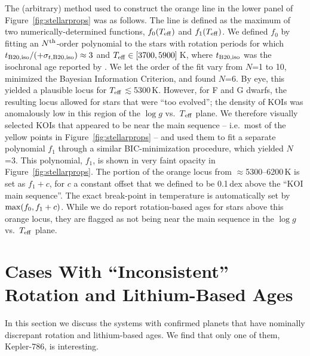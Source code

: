 \documentclass[11pt,twocolumn,tighten]{aastex63}
\begin{document}
The (arbitrary) method used to construct the orange line in 
the lower panel of Figure~\ref{fig:stellarprops} was as follows.
The line is	defined as
the maximum of two numerically-determined functions, $f_0(T_{\rm eff})$ and $f_1(T_{\rm eff})$.
We defined $f_0$ by fitting an
$N^{\rm th}$-order polynomial to the stars with rotation periods for which $t_{\rm
	B20,iso}/(+\sigma_{t,{\rm B20,iso}})\approx 3$
and $T_{\rm eff}\in[3700,5900]$\,K, where
$t_{\rm B20,iso}$ was the isochronal age reported by
\citet{Berger_2020a_catalog}.  We let the order of the fit vary from
$N$=1 to 10, minimized the Bayesian Information Criterion,
and found $N$=6.  
By eye, this yielded a plausible locus for $T_{\rm eff}$$\lesssim$5300\,K.
However, for F and G dwarfs, the resulting locus
allowed for stars that were ``too evolved''; the density of KOIs 
was anomalously low in this region of the $\log g$ vs.\ $T$$_{\rm eff}$ plane.
We therefore visually selected KOIs that appeared
to be near the main sequence -- i.e.~most of the yellow
points in Figure~\ref{fig:stellarprops} -- and used them to fit a separate
polynomial $f_1$ through a similar BIC-minimization procedure,
which yielded $N$=3.
This polynomial, $f_1$, is shown in very faint opacity in Figure~\ref{fig:stellarprops}.
The portion of the orange locus from $\approx$5300--6200\,K
is set as $f_1 + c$, for $c$ a constant offset that we defined to be
0.1\,dex above the ``KOI main sequence''.
The exact break-point in temperature is automatically set by ${\rm max}(f_0, f_1+c)$.
While we do report rotation-based ages for stars
above this orange locus,
they are flagged as not being near the main sequence in the $\log g$ vs.~$T_{\rm eff}$ plane. 


\section{Cases With ``Inconsistent'' Rotation and Lithium-Based Ages}
\label{app:inconsistent}

In this section we discuss the systems with confirmed planets that
have nominally discrepant rotation and lithium-based ages.  We find
that only one of them, Kepler-786, is interesting.
\end{document}
